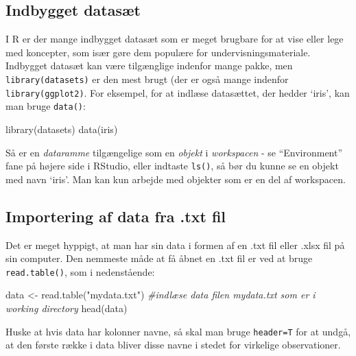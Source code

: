 \documentclass[
]{book}
\newenvironment{Shaded}{\begin{snugshade}}{\end{snugshade}}
\newcommand{\CommentTok}[1]{\textcolor[rgb]{0.56,0.35,0.01}{\textit{#1}}}
\newcommand{\FunctionTok}[1]{\textcolor[rgb]{0.00,0.00,0.00}{#1}}
\newcommand{\NormalTok}[1]{#1}
\newcommand{\OtherTok}[1]{\textcolor[rgb]{0.56,0.35,0.01}{#1}}
\newcommand{\StringTok}[1]{\textcolor[rgb]{0.31,0.60,0.02}{#1}}
\begin{document}
\hypertarget{indbygget-datasuxe6t}{%
\subsection{Indbygget datasæt}\label{indbygget-datasuxe6t}}

I R er der mange indbygget datasæt som er meget brugbare for at vise eller lege med koncepter, som især gøre dem populære for undervisningsmateriale. Indbygget datasæt kan være tilgænglige indenfor mange pakke, men \texttt{library(datasets)} er den mest brugt (der er også mange indenfor \texttt{library(ggplot2)}. For eksempel, for at indlæse datasættet, der hedder `iris', kan man bruge \texttt{data()}:

\begin{Shaded}
\begin{Highlighting}[]
\FunctionTok{library}\NormalTok{(datasets)}
\FunctionTok{data}\NormalTok{(iris)}
\end{Highlighting}
\end{Shaded}

Så er en \emph{dataramme} tilgængelige som en \emph{objekt} i \emph{workspacen} - se ``Environment'' fane på højere side i RStudio, eller indtaste \texttt{ls()}, så bør du kunne se en objekt med navn `iris'. Man kan kun arbejde med objekter som er en del af workspacen.

\hypertarget{importering-af-data-fra-.txt-fil}{%
\subsection{Importering af data fra .txt fil}\label{importering-af-data-fra-.txt-fil}}

Det er meget hyppigt, at man har sin data i formen af en .txt fil eller .xlsx fil på sin computer. Den nemmeste måde at få åbnet en .txt fil er ved at bruge \texttt{read.table()}, som i nedenstående:

\begin{Shaded}
\begin{Highlighting}[]
\NormalTok{data }\OtherTok{\textless{}{-}} \FunctionTok{read.table}\NormalTok{(}\StringTok{"mydata.txt"}\NormalTok{) }\CommentTok{\#indlæse data filen mydata.txt som er i working directory}
\FunctionTok{head}\NormalTok{(data)}
\end{Highlighting}
\end{Shaded}

Huske at hvis data har kolonner navne, så skal man bruge \texttt{header=T} for at undgå, at den første række i data bliver disse navne i stedet for virkelige observationer.
\end{document}

